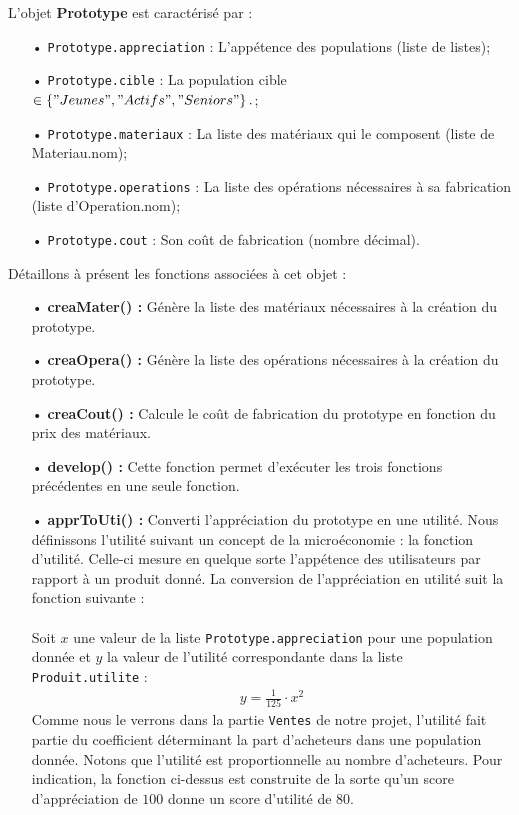 \noindent
	L'objet \textbf{Prototype} est caractérisé par :
	\begin{enumerate}
		\item[•] \texttt{Prototype.appreciation} : L'appétence des populations (liste de listes);
		\item[•] \texttt{Prototype.cible} : La population cible $\in \left\{ "Jeunes", "Actifs", "Seniors"\right\}.$;
		\item[•] \texttt{Prototype.materiaux} : La liste des matériaux qui le composent (liste de Materiau.nom);
		\item[•] \texttt{Prototype.operations} : La liste des opérations nécessaires à sa fabrication (liste d'Operation.nom);
		\item[•] \texttt{Prototype.cout} : Son coût de fabrication (nombre décimal).
	\end{enumerate}
\noindent
Détaillons à présent les fonctions associées à cet objet :

\begin{enumerate}
	\item[•] \textbf{creaMater() :} Génère la liste des matériaux nécessaires à la création du prototype.
	\item[•] \textbf{creaOpera() :} Génère la liste des opérations nécessaires à la création du prototype.
	\item[•] \textbf{creaCout() :} Calcule le coût de fabrication du prototype en fonction du prix des matériaux.
	\item[•] \textbf{develop() :} Cette fonction permet d'exécuter les trois fonctions précédentes en une seule fonction.
	\item[•] \textbf{apprToUti() :} Converti l'appréciation du prototype en une utilité. Nous définissons l'utilité suivant un concept de la microéconomie : la fonction d'utilité. Celle-ci mesure en quelque sorte l'appétence des utilisateurs par rapport à un produit donné. La conversion de l'appréciation en utilité suit la fonction suivante : \\ \\
Soit $x$ une valeur de la liste \texttt{Prototype.appreciation} pour une population donnée et $y$ la valeur de l'utilité correspondante dans la liste \texttt{Produit.utilite} : 	
	\begin{align*}
		y =\frac{1}{125}\cdot x^{2}
	\end{align*}
Comme nous le verrons dans la partie \texttt{Ventes} de notre projet, l'utilité fait partie du coefficient déterminant la part d'acheteurs dans une population donnée. Notons que l'utilité est proportionnelle au nombre d'acheteurs. Pour indication, la fonction ci-dessus est construite de la sorte qu'un score d'appréciation de $100$ donne un score d'utilité de $80$.
\end{enumerate}

